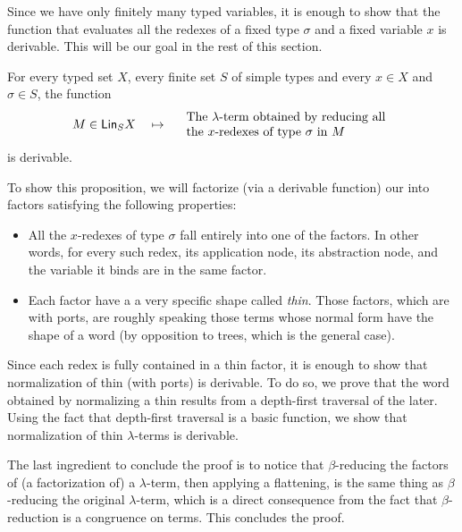   Since we have only finitely many typed variables, it is enough to show that the function that evaluates all the redexes of a fixed type $\sigma$ and a fixed variable $x$ is derivable. This will be our goal in the rest of this section.

\begin{proposition}\label{thm:evalOneType}
 For every typed set $X$, every finite set $S$ of simple types and every $x\in X$ and $\sigma\in S$, the function 
    \begin{align*}
        M \in  \mathsf{Lin}_{S} X \quad \mapsto \quad  \begin{array}{l}
        \text{The $\lambda$-term obtained by reducing all}\\ \text{the $x$-redexes of type $\sigma$ in $M$} 
        \end{array}
    \end{align*}
    is derivable.
\end{proposition}

To show this proposition, we will factorize (via a derivable function) our \lambdaterms into factors satisfying the following properties:
\begin{itemize}
\item All the $x$-redexes of type $\sigma$ fall entirely into one of the factors. In other words, for every such redex, its application node, its abstraction node, and the variable it binds are in the same factor.
\item Each factor have a a very specific shape called \emph{thin}. Those factors, which are \lambdaterms with ports, are roughly speaking those terms whose normal form have the shape of a word (by opposition to trees, which is the general case).
\end{itemize}
Since each redex is fully contained in a thin factor, it is enough to show that normalization of thin \lambdaterms (with ports) is derivable. To do so, we prove that the word obtained by normalizing a thin \lambdaterm results from a depth-first traversal of the later. Using the fact that depth-first traversal is a basic function, we show that normalization of thin $\lambda$-terms is derivable.
 
 The last ingredient to conclude the proof is to notice that $\beta$-reducing the factors of (a factorization of) a $\lambda$-term, then applying a flattening, is the same thing as $\beta$-reducing the original $\lambda$-term, which is a direct consequence from the fact that $\beta$-reduction is a congruence on terms. This concludes the proof. 
 
